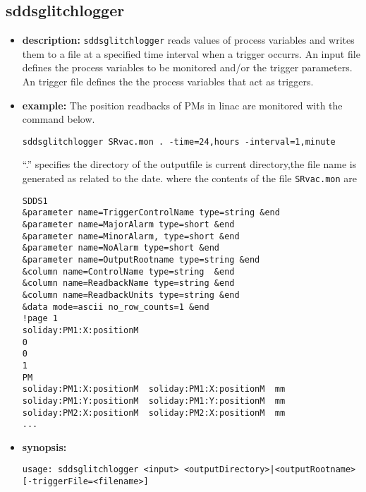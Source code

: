 %
%
\begin{latexonly}
\newpage
\end{latexonly}

%
%
\subsection{sddsglitchlogger}
\label{sddsglitchlogger}

\begin{itemize}
\item {\bf description:}
%
%
\verb+sddsglitchlogger+ reads values of process variables and writes them to a file at a specified time interval when a trigger occurrs.
An input file defines the process variables to be monitored and/or the trigger parameters.
An trigger file defines the the process variables that act as triggers.
\item {\bf example:} 
%
% 
%
The position readbacks of PMs in linac are monitored with the command below.
\begin{verbatim}
sddsglitchlogger SRvac.mon . -time=24,hours -interval=1,minute
\end{verbatim}
``.'' specifies the directory of the outputfile is current directory,the file name is generated
as related to the date.
where the contents of the file \verb+SRvac.mon+ are
\begin{verbatim}
SDDS1
&parameter name=TriggerControlName type=string &end
&parameter name=MajorAlarm type=short &end
&parameter name=MinorAlarm, type=short &end
&parameter name=NoAlarm type=short &end
&parameter name=OutputRootname type=string &end
&column name=ControlName type=string  &end
&column name=ReadbackName type=string &end
&column name=ReadbackUnits type=string &end
&data mode=ascii no_row_counts=1 &end
!page 1
soliday:PM1:X:positionM
0
0
1
PM
soliday:PM1:X:positionM  soliday:PM1:X:positionM  mm
soliday:PM1:Y:positionM  soliday:PM1:Y:positionM  mm
soliday:PM2:X:positionM  soliday:PM2:X:positionM  mm
...
\end{verbatim}
\item {\bf synopsis:} 
%
%
\begin{verbatim}
usage: sddsglitchlogger <input> <outputDirectory>|<outputRootname> [-triggerFile=<filename>]

\end{verbatim}
\end{itemize}

